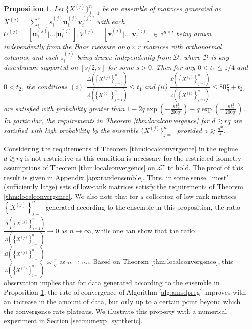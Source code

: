 \documentclass[11pt,letterpaper]{article}
\newtheorem{proposition}[theorem]{Proposition}
\newcommand{\R}{\mathbb{R}}
\newcommand{\bu}{\mathbf{u}}
\newcommand{\bv}{\mathbf{v}}
\renewcommand{\L}{\mathcal{L}}
\begin{document}
\begin{proposition} \label{thm:randensemble} Let $\{X^{(j)}\}_{j=1}^{n}$ be an ensemble of matrices generated as $X^{(j)} = \sum_{i=1}^{r} s_{i}^{(j)} \bu_{i}^{(j)} \bv_{i}^{(j)\prime}$ with each $U^{(j)} = [\bu_{1}^{(j)}| \ldots | \bu_{r}^{(j)}], V^{(j)} = [\bv_{1}^{(j)}| \ldots | \bv_{r}^{(j)}] \in \R^{q \times r}$ being drawn independently from the Haar measure on $q \times r$ matrices with orthonormal columns, and each $s_{i}^{(j)}$ being drawn independently from $\mathcal{D}$, where $\mathcal{D}$ is any distribution supported on $[s/2,s]$ for some $s>0$.  Then for any $0 < t_1 \leq 1/4$ and $0 < t_2$, the conditions $(i)$ $\frac{\Delta\left(\left\{X^{(j)} \right\}_{j=1}^n \right)}{\Lambda\left( \left\{X^{(j)} \right\}_{j=1}^n \right)} \leq t_1 $ and (ii) $\frac{\Omega\left(\left\{X^{(j)} \right\}_{j=1}^n \right)}{\Lambda\left( \left\{X^{(j)} \right\}_{j=1}^n \right)} \leq 80\frac{ r}{q} + t_2$, are satisfied with probability greater than $1- 2q\exp\left(-\frac{n t_1^2}{200q^4}\right) - q \exp\left(-\frac{n t_2^2}{200q^4}\right)$.  In particular, the requirements in Theorem \ref{thm:localconvergence} for $d \gtrsim rq$ are satisfied with high probability by the ensemble $\{X^{(j)}\}_{j=1}^{n}$ provided $n \gtrsim \frac{q^{10}}{d}$.
\end{proposition}

Considering the requirements of Theorem \ref{thm:localconvergence} in the regime $d \gtrsim rq$ is not restrictive as this condition is necessary for the restricted isometry assumptions of Theorem \ref{thm:localconvergence} on $\L^\star$ to hold.  The proof of this result is given in Appendix \ref{apx:randensemble}.  Thus, in some sense, `most' (sufficiently large) sets of low-rank matrices satisfy the requirements of Theorem \ref{thm:localconvergence}.  We also note that for a collection of low-rank matrices $\left\{X^{(j)} \right\}_{j=1}^n$ generated according to the ensemble in this proposition, the ratio $\frac{\Delta\left(\left\{X^{(j)} \right\}_{j=1}^n \right)}{\Lambda\left( \left\{X^{(j)} \right\}_{j=1}^n \right)} \rightarrow 0$ as $n \rightarrow \infty$, while one can show that the ratio $\frac{\Omega\left(\left\{X^{(j)} \right\}_{j=1}^n \right)}{\Lambda\left( \left\{X^{(j)} \right\}_{j=1}^n \right)} \asymp \frac{r}{q}$ as $n \rightarrow \infty$.  Based on Theorem \ref{thm:localconvergence}, this observation implies that for data generated according to the ensemble in Proposition \ref{thm:randensemble}, the rate of convergence of Algorithm \ref{alg:amsdpreg} improves with an increase in the amount of data, but only up to a certain point beyond which the convergence rate plateaus.  We illustrate this property with a numerical experiment in Section \ref{sec:numexp_synthetic}.
\end{document}
